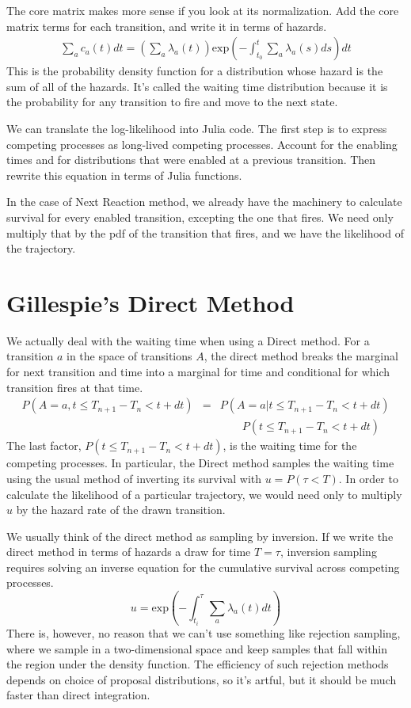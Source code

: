 \documentclass{article}
\begin{document}
The core matrix makes more sense if you look at its normalization. Add the core matrix terms for each transition, and write it in terms of hazards.
\begin{eqnarray}
	\sum_a c_a(t)dt = \left(\sum_a \lambda_a(t)\right)\mbox{exp}\left(-\int_{t_0}^t\sum_a \lambda_a(s)ds \right)dt
\end{eqnarray}
This is the probability density function for a distribution whose hazard is the sum of all of the hazards. It's called the waiting time distribution because it is the probability for any transition to fire and move to the next state.

We can translate the log-likelihood into Julia code. The first step is to express competing processes as long-lived competing processes. Account for the enabling times and for distributions that were enabled at a previous transition. Then rewrite this equation in terms of Julia functions.

In the case of Next Reaction method, we already have the machinery to calculate survival for every enabled transition, excepting the one that fires. We need only multiply that by the pdf of the transition that fires, and we have the likelihood of the trajectory.


\section{Gillespie's Direct Method}

We actually deal with the waiting time when using a Direct method. For a transition $a$ in the space of transitions $A$, the direct method breaks the marginal for next transition and time into a marginal for time and conditional for which transition fires at that time.
\begin{eqnarray*}
	P(A=a, t\le T_{n+1}-T_n<t+dt) &=& P(A=a|t\le T_{n+1}-T_n<t+dt) \\
	& & \qquad P(t\le T_{n+1}-T_n<t+dt)
\end{eqnarray*}
The last factor, $P(t\le T_{n+1}-T_n<t+dt)$, is the waiting time for the competing processes. In particular, the Direct method samples the waiting time using the usual method of inverting its survival with $u=P(\tau<T)$. In order to calculate the likelihood of a particular trajectory, we would need only to multiply $u$ by the hazard rate of the drawn transition.

We usually think of the direct method as sampling by inversion. If we write the direct method in terms of hazards a draw for time $T=\tau$, inversion sampling requires solving an inverse equation for the cumulative survival across competing processes.
\begin{equation}
	u = \mbox{exp}\left(-\int_{t_i}^\tau\sum_a \lambda_a(t)dt\right)
\end{equation}
There is, however, no reason that we can't use something like rejection sampling, where we sample in a two-dimensional space and keep samples that fall within the region under the density function. The efficiency of such rejection methods depends on choice of proposal distributions, so it's artful, but it should be much faster than direct integration.
\end{document}
